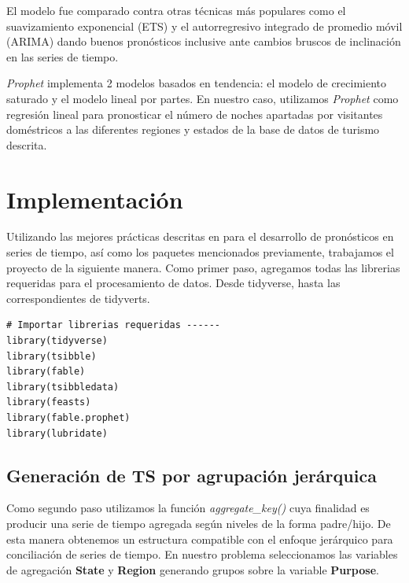 \newpage

El modelo fue comparado contra otras técnicas más populares como el suavizamiento exponencial (ETS) y el autorregresivo integrado de promedio móvil (ARIMA) dando buenos pronósticos inclusive ante cambios bruscos de inclinación en las series de tiempo.

\textit{Prophet} implementa 2 modelos basados en tendencia: el modelo de crecimiento saturado y el modelo lineal por partes. En nuestro caso, utilizamos \textit{Prophet} como regresión lineal para pronosticar el número de noches apartadas por visitantes doméstricos a las diferentes regiones y estados de la base de datos de turismo descrita. 


\section{Implementación}

Utilizando las mejores prácticas descritas en \cite{hyndman2018forecasting} para el desarrollo de pronósticos en series de tiempo, así como los paquetes mencionados previamente, trabajamos el proyecto de la siguiente manera. Como primer paso, agregamos todas las librerias requeridas para el procesamiento de datos. Desde tidyverse, hasta las correspondientes de tidyverts.

\begin{lstlisting}
# Importar librerias requeridas ------
library(tidyverse)
library(tsibble)
library(fable)
library(tsibbledata)
library(feasts)
library(fable.prophet)
library(lubridate)
\end{lstlisting}


\subsection{Generación de TS por agrupación jerárquica}

Como segundo paso utilizamos la función \textit{aggregate\_key()} cuya finalidad es producir una serie de tiempo agregada según niveles de la forma padre/hijo. De esta manera obtenemos un estructura compatible con el enfoque jerárquico para conciliación de series de tiempo. En nuestro problema seleccionamos las variables de agregación \textbf{State} y \textbf{Region} generando grupos sobre la variable \textbf{Purpose}.


